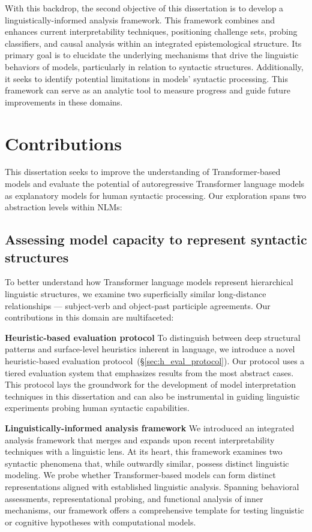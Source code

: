 With this backdrop, the second objective of this dissertation is to develop a linguistically-informed analysis framework. This framework combines and enhances current interpretability techniques, positioning challenge sets, probing classifiers, and causal analysis within an integrated epistemological structure. Its primary goal is to elucidate the underlying mechanisms that drive the linguistic behaviors of models, particularly in relation to syntactic structures. Additionally, it seeks to identify potential limitations in models' syntactic processing. This framework can serve as an analytic tool to measure progress and guide future improvements in these domains.


\section{Contributions}
This dissertation seeks to improve the understanding of Transformer-based models and evaluate the potential of autoregressive Transformer language models as explanatory models for human syntactic processing. Our exploration spans two abstraction levels within NLMs: 

\subsection{Assessing model capacity to represent syntactic structures}
To better understand how Transformer language models represent hierarchical linguistic structures, we examine two superficially similar long-distance relationships --- subject-verb and object-past participle agreements. Our contributions in this domain are multifaceted:

\textbf{Heuristic-based evaluation protocol} To distinguish between deep structural patterns and surface-level heuristics inherent in language, we introduce a novel heuristic-based evaluation protocol~(\S\ref{sec:h_eval_protocol}). Our protocol uses a tiered evaluation system that emphasizes results from the most abstract cases. This protocol lays the groundwork for the development of model interpretation techniques in this dissertation and can also be instrumental in guiding linguistic experiments probing human syntactic capabilities.

\textbf{Linguistically-informed analysis framework} We introduced an integrated analysis framework that merges and expands upon recent interpretability techniques with a linguistic lens. At its heart, this framework examines two syntactic phenomena that, while outwardly similar, possess distinct linguistic modeling. We probe whether Transformer-based models can form distinct representations aligned with established linguistic analysis. Spanning behavioral assessments, representational probing, and functional analysis of inner mechanisms, our framework offers a comprehensive template for testing linguistic or cognitive hypotheses with computational models. 


